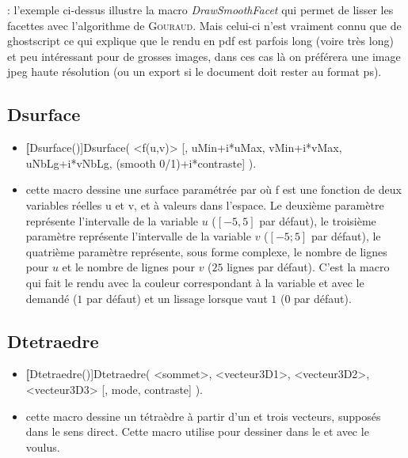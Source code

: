 : l'exemple ci-dessus illustre la macro \textit{DrawSmoothFacet} qui permet de lisser les facettes avec l'algorithme de \textsc{Gouraud}. Mais celui-ci n'est vraiment connu que de ghostscript ce qui explique que le rendu en pdf est parfois long (voire très long) et peu intéressant pour de grosses images, dans ces cas là on préférera une image jpeg haute résolution (ou un export  si le document doit rester au format ps).

\subsection{Dsurface}
\begin{itemize}
 \item \util \textbf[Dsurface()]{Dsurface( <f(u,v)> [, uMin+i*uMax, vMin+i*vMax, uNbLg+i*vNbLg, (smooth 0/1)+i*contraste] )}.
 \item \desc cette macro dessine une surface paramétrée par  où f est une fonction de deux variables réelles u et v, et à valeurs dans l'espace. Le deuxième paramètre représente l'intervalle de la variable $u$ ($[-5,5]$ par défaut), le troisième paramètre représente l'intervalle de la variable $v$ ($[-5;5]$ par défaut), le quatrième paramètre représente, sous forme complexe, le nombre de lignes pour $u$ et le nombre de lignes pour $v$ ($25$ lignes par défaut). C'est la macro  qui fait le rendu avec la couleur correspondant à la variable  et avec le  demandé ($1$ par défaut) et un lissage lorsque  vaut $1$ ($0$ par défaut).
\end{itemize}


\subsection{Dtetraedre}
\begin{itemize}
 \item \util \textbf[Dtetraedre()]{Dtetraedre( <sommet>, <vecteur3D1>, <vecteur3D2>, <vecteur3D3> [, mode, contraste] )}.
 \item \desc cette macro dessine un tétraèdre à partir d'un  et trois vecteurs, supposés dans le sens direct. Cette macro utilise  pour dessiner dans le  et avec le  voulus.
\end{itemize}
